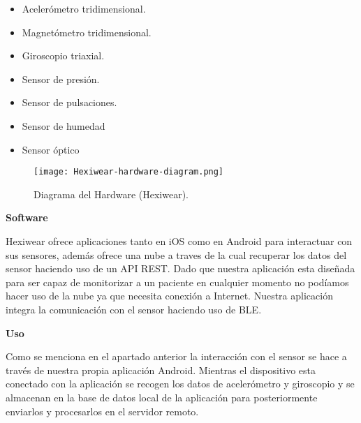 \documentclass[11pt,spanish]{article}
\begin{document}
\begin{itemize}
  \item Acelerómetro tridimensional.
  \item Magnetómetro tridimensional.
  \item Giroscopio triaxial.
  \item Sensor de presión.
  \item Sensor de pulsaciones.
  \item Sensor de humedad
  \item Sensor óptico
\end{itemize}

\begin{figure}[H]
  \centering
  \texttt{[image: Hexiwear-hardware-diagram.png]}
  \caption{Diagrama del Hardware (Hexiwear).}
\end{figure}

{\bf Software}
\newline

Hexiwear ofrece aplicaciones tanto en iOS como en Android para interactuar con sus sensores, además ofrece una nube a traves de la cual recuperar los datos del sensor haciendo uso de un API REST. Dado que nuestra aplicación esta diseñada para ser capaz de monitorizar a un paciente en cualquier momento no podíamos hacer uso de la nube ya que necesita conexión a Internet. Nuestra aplicación integra la comunicación con el sensor haciendo uso de BLE.
\newline

{\bf Uso}
\newline

Como se menciona en el apartado anterior la interacción con el sensor se hace a través de nuestra propia aplicación Android. Mientras el dispositivo esta conectado con la aplicación se recogen los datos de acelerómetro y giroscopio y se almacenan en la base de datos local de la aplicación para posteriormente enviarlos y procesarlos en el servidor remoto.
\end{document}

